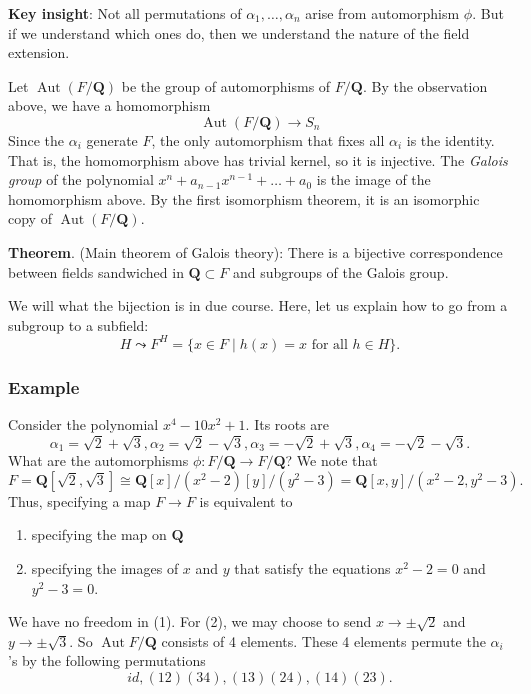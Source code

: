 \documentclass[11pt]{article}
\begin{document}
\textbf{\textbf{Key insight}}: Not all permutations of \(\alpha_1, \dots, \alpha_n\) arise from automorphism \(\phi\).
But if we understand which ones do, then we understand the nature of the field extension.

Let \(\operatorname{Aut}(F / \mathbf{Q})\) be the group of automorphisms of \(F/\mathbf{Q}\).
By the observation above, we have a homomorphism
\[ \operatorname{Aut}(F / \mathbf{Q} ) \to S_{n}\]
Since the \(\alpha_i\) generate \(F\), the only automorphism that fixes all \(\alpha_{i}\) is the identity.
That is, the homomorphism above has trivial kernel, so it is injective.
The \emph{Galois group} of the polynomial \(x^n+a_{n-1}x^{n-1}+ \dots +a_{0}\) is the image of the homomorphism above.
By the first isomorphism theorem, it is an isomorphic copy of \(\operatorname{Aut}(F / \mathbf{Q} )\).

\textbf{\textbf{Theorem}}. (Main theorem of Galois theory):
There is a bijective correspondence between fields sandwiched in \(\mathbf{Q} \subset F\) and subgroups of the Galois group.

We will what the bijection is in due course. 
Here, let us explain how to go from a subgroup to a subfield:
\[ H \leadsto F^H = \{x \in F \mid h(x) = x \text{ for all } h \in H\}.\]
\subsubsection{Example}
\label{sec:orgdef2390}
Consider the polynomial \(x^4-10x^2+1\).
Its roots are
\[ \alpha_1 = \sqrt 2 + \sqrt 3, \alpha_2 = \sqrt 2 - \sqrt 3, \alpha_3 = -\sqrt 2 + \sqrt 3, \alpha_4 = -\sqrt 2 - \sqrt 3.\]
What are the automorphisms \(\phi \colon F / \mathbf{Q} \to F / \mathbf{Q}\)?
We note that
\[ F = \mathbf{Q}[\sqrt 2, \sqrt 3] \cong \mathbf{Q}[x]/(x^2-2) [y]/(y^2-3) = \mathbf{Q}[x,y]/(x^2-2,y^2-3).\]
Thus, specifying a map \(F \to F\) is equivalent to
\begin{enumerate}
\item specifying the map on \(\mathbf{Q}\)
\item specifying the images of \(x\) and \(y\) that satisfy the equations \(x^2-2 = 0\) and \(y^2-3 = 0\).
\end{enumerate}
We have no freedom in (1). 
For (2), we may choose to send \(x \to \pm \sqrt 2\) and \(y \to \pm \sqrt 3\).
So \(\operatorname{Aut} F/ \mathbf{Q}\) consists of 4 elements.
These 4 elements permute the \(\alpha_{i}\)'s by the following permutations
\[ id, (12)(34), (13)(24), (14)(23).\]
\end{document}
